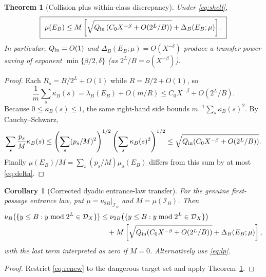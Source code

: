 \documentclass[10pt]{amsart}
\newtheorem{theorem}{Theorem}
\newtheorem{corollary}{Corollary}
\theoremstyle{definition}\newtheorem{definition}{Definition}
\theoremstyle{remark}\newtheorem{remark}{Remark}
\newcommand{\cI}{\mathcal I}
\newcommand{\cD}{\mathcal D}
\begin{document}
\begin{theorem}[Collision plus within-class discrepancy]\label{thm:collision}
Under \eqref{eq:shell},
\begin{equation}\label{eq:coll}
 \boxed{\ \mu(E_B)\le M\left[\sqrt{Q_{\rm in}\left(C_0X^{-\beta}+O(2^L/B)\right)}+\Delta_B(E_B;\mu)\right].\ }
\end{equation}
In particular, $Q_{\rm in}=O(1)$ and $\Delta_B(E_B;\mu)=O(X^{-\delta})$ produce a transfer power saving of exponent $\min\{\beta/2,\delta\}$ (as $2^L/B=o(X^{-\beta})$).
\end{theorem}
\begin{proof}
Each $R_s=B/2^L+O(1)$ while $R=B/2+O(1)$, so
\[
 \frac1m\sum_s\kappa_B(s)
 =\lambda_B(E_B)+O(m/R)
 \le C_0X^{-\beta}+O(2^L/B).
\]
Because $0\le\kappa_B(s)\le1$, the same right-hand side bounds $m^{-1}\sum_s\kappa_B(s)^2$.  By Cauchy--Schwarz,
\[
 \sum_s\frac{p_s}{M}\kappa_B(s)
 \le\left(\sum_s(p_s/M)^2\right)^{1/2}
 \left(\sum_s\kappa_B(s)^2\right)^{1/2}
 \le\sqrt{Q_{\rm in}(C_0X^{-\beta}+O(2^L/B))}.
\]
Finally $\mu(E_B)/M=\sum_s(p_s/M)\mu_s(E_B)$ differs from this sum by at most \eqref{eq:delta}.
\end{proof}

\begin{corollary}[Corrected dyadic entrance-law transfer]\label{cor:global}
For the genuine first-passage entrance law, put $\mu=\nu_{2B}|_{\cI_B}$ and $M=\mu(\cI_B)$. Then
\begin{align*}
 \nu_B\bigl(\{y\le B:y\bmod2^L\in\cD_X\}\bigr)
 &\le\nu_{2B}\bigl(\{y\le B:y\bmod2^L\in\cD_X\}\bigr)\\
 &\quad+M\left[\sqrt{Q_{\rm in}(C_0X^{-\beta}+O(2^L/B))}
 +\Delta_B(E_B;\mu)\right],
\end{align*}
with the last term interpreted as zero if $M=0$. Alternatively use \eqref{eq:lp}.
\end{corollary}
\begin{proof}
Restrict \eqref{eq:renew} to the dangerous target set and apply Theorem~\ref{thm:collision}.
\end{proof}
\end{document}
